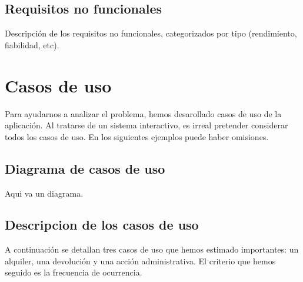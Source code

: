 \documentclass[a4paper, 12pt]{article}
\begin{document}
\subsection{Requisitos no funcionales}
Descripción de los requisitos no funcionales, categorizados por tipo (rendimiento, fiabilidad, etc).

\section{Casos de uso}
Para ayudarnos a analizar el problema, hemos desarollado casos de uso de la aplicación.
Al tratarse de un sistema interactivo, es irreal pretender considerar todos los casos de uso.
En los siguientes ejemplos puede haber omisiones.

\subsection{Diagrama de casos de uso}
Aqui va un diagrama.


\subsection{Descripcion de los casos de uso}
A continuación se detallan tres casos de uso que hemos estimado importantes: un alquiler, una devolución y una acción administrativa. El criterio que hemos seguido es la frecuencia de ocurrencia.
\end{document}
